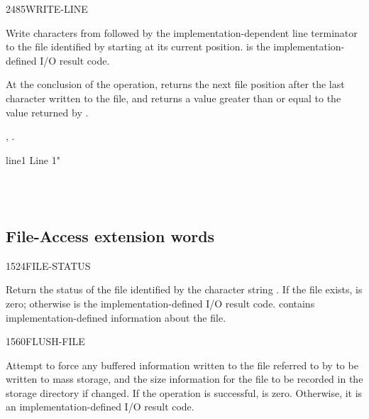 \begin{worddef}{2485}{WRITE-LINE}
\item {}

	Write  characters from  followed by the
	implementation-dependent line terminator to the file identified
	by  starting at its current position.  is
	the implementation-defined I/O result code.

	At the conclusion of the operation,  returns
	the next file position after the last character written to the
	file, and  returns a value greater than or equal
	to the value returned by .

\see {},
	.

	\begin{testing}\ttfamily
		\word{:} line1  Line 1" \word{;}

		 \\
		 \\
	\end{testing}
\end{worddef}


\subsection{File-Access extension words} %
\extended

\begin{worddef}{1524}{FILE-STATUS}
\item {}

	Return the status of the file identified by the character string
	. If the file exists,  is zero;
	otherwise  is the implementation-defined I/O result
	code.  contains implementation-defined information about
	the file.
\end{worddef}


\begin{worddef}{1560}{FLUSH-FILE}
\item {}

	Attempt to force any buffered information written to the file
	referred to by  to be written to mass storage, and
	the size information for the file to be recorded in the storage
	directory if changed. If the operation is successful, 
	is zero. Otherwise, it is an implementation-defined I/O result
	code.
\end{worddef}


